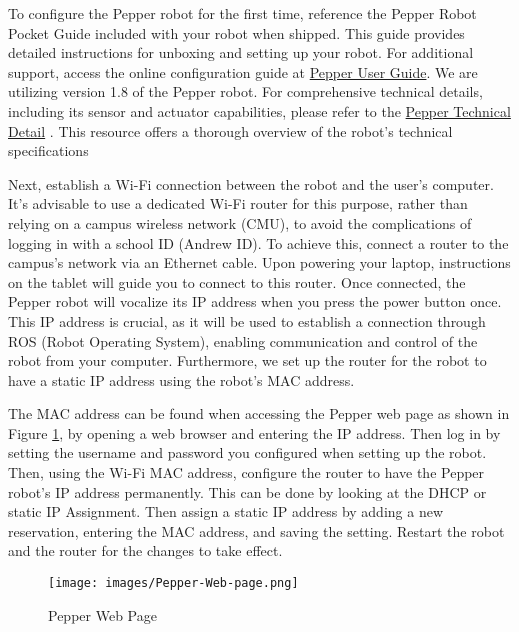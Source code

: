 \documentclass{CSSRforAfrica}
\begin{document}
	{\label{setup_pepper}
		To configure the Pepper robot for the first time, reference the Pepper Robot Pocket Guide included with your robot when shipped. This guide provides detailed instructions for unboxing and setting up your robot. For additional support, access the online configuration guide at \href{http://doc.aldebaran.com/2-5/family/pepper_user_guide/first_conf_pep.html}{Pepper User Guide}. We are utilizing version 1.8 of the Pepper robot. For comprehensive technical details, including its sensor and actuator capabilities, please refer to the 
		\href{http://doc.aldebaran.com/2-5/family/pepper_technical/index_pep.html}{Pepper Technical Detail} \cite{SoftBankDocumentation}. This resource offers a thorough overview of the robot's technical specifications
		
		Next, establish a Wi-Fi connection between the robot and the user's computer. It's advisable to use a dedicated Wi-Fi router for this purpose, rather than relying on a campus wireless network (CMU), to avoid the complications of logging in with a school ID (Andrew ID). To achieve this, connect a router to the campus's network via an Ethernet cable. Upon powering your laptop, instructions on the tablet will guide you to connect to this router. Once connected, the Pepper robot will vocalize its IP address when you press the power button once. This IP address is crucial, as it will be used to establish a connection through ROS (Robot Operating System), enabling communication and control of the robot from your computer. Furthermore, we set up the router for the robot to have a static IP address using the robot's MAC address. 
		
		The MAC address can be found when accessing the Pepper web page as shown in Figure \ref{fig:pepper-web-page}, by opening a web browser and entering the IP address. Then log in by setting the username and password you configured when setting up the robot. Then, using the Wi-Fi MAC address, configure the router to have the Pepper robot's IP address permanently. This can be done by looking at the DHCP or static IP Assignment. Then assign a static IP address by adding a new reservation, entering the MAC  address, and saving the setting. Restart the robot and the router for the changes to take effect.
		
		\begin{figure}[!hbpt]
			\centering
			\texttt{[image: images/Pepper-Web-page.png]}
			\caption{Pepper Web Page}
			\label{fig:pepper-web-page}
		\end{figure}
	}
	
\end{document}

